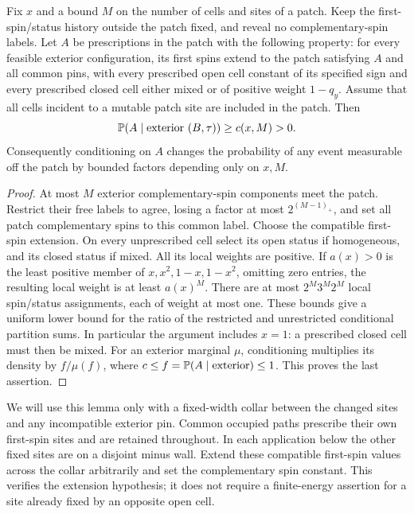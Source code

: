 \begin{lemma}
\label{annulus:patch}
Fix $x$ and a bound $M$ on the number of cells and sites of a patch.
Keep the first-spin/status history outside the patch fixed, and reveal
no complementary-spin labels.  Let $A$ be prescriptions in the patch
with the following property: for every feasible exterior configuration,
its first spins extend to the patch satisfying $A$ and all common pins,
with every prescribed open cell constant of its specified sign and every
prescribed closed cell either mixed or of positive weight $1-q_y$.
Assume that all cells incident to a mutable patch site are included in
the patch.  Then
\[
             \mathbb P(A\mid\hbox{exterior }(B,\tau))\geq c(x,M)>0.
\]
Consequently conditioning on $A$ changes the probability of any event
measurable off the patch by bounded factors depending only on $x,M$.
\end{lemma}
\begin{proof}
At most $M$ exterior complementary-spin components meet the patch.
Restrict their free labels to agree, losing a factor at most
$2^{(M-1)_+}$, and set all patch complementary spins to this common
label.  Choose the compatible first-spin extension.  On every
unprescribed cell select its open status if homogeneous, and its closed
status if mixed.  All its local weights are positive.  If $a(x)>0$ is
the least positive member of $x,x^2,1-x,1-x^2$, omitting zero entries,
the resulting local weight is at least $a(x)^M$.  There are at most
$2^M3^M2^M$ local spin/status assignments, each of weight at most one.
These bounds give a uniform lower bound for the ratio of the restricted
and unrestricted conditional partition sums.  In particular the
argument includes $x=1$: a prescribed closed cell must then be mixed.
For an exterior marginal $\mu$, conditioning multiplies its density by
$f/\mu(f)$, where $c\leq f=\mathbb P(A\mid\hbox{exterior})\leq1$.
This proves the last assertion.
\end{proof}

We will use this lemma only with a fixed-width collar between the
changed sites and any incompatible exterior pin.  Common occupied
paths prescribe their own first-spin sites and are retained throughout.
In each application below the other fixed sites are on a disjoint
minus wall.  Extend these compatible first-spin values across the
collar arbitrarily and set the complementary spin constant.  This
verifies the extension hypothesis; it does not require a finite-energy
assertion for a site already fixed by an opposite open cell.

